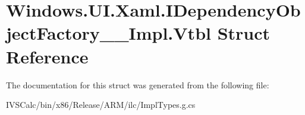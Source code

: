 \hypertarget{struct_windows_1_1_u_i_1_1_xaml_1_1_i_dependency_object_factory_____impl_1_1_vtbl}{}\section{Windows.\+U\+I.\+Xaml.\+I\+Dependency\+Object\+Factory\+\_\+\+\_\+\+Impl.\+Vtbl Struct Reference}
\label{struct_windows_1_1_u_i_1_1_xaml_1_1_i_dependency_object_factory_____impl_1_1_vtbl}


The documentation for this struct was generated from the following file\+:\begin{DoxyCompactItemize}
\item 
I\+V\+S\+Calc/bin/x86/\+Release/\+A\+R\+M/ilc/Impl\+Types.\+g.\+cs\end{DoxyCompactItemize}

